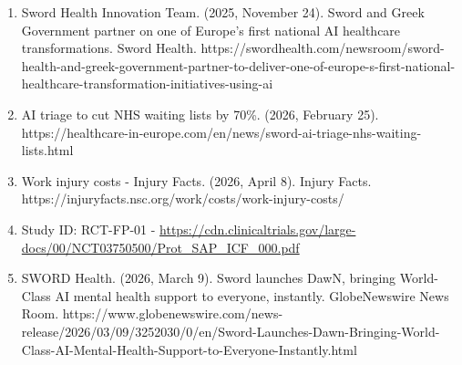 \documentclass[12pt]{article}
\begin{document}
\begin{enumerate}
    \item Sword Health Innovation Team. (2025, November 24). Sword and Greek Government partner on one of Europe’s first national AI healthcare transformations. Sword Health. https://swordhealth.com/newsroom/sword-health-and-greek-government-partner-to-deliver-one-of-europe-s-first-national-healthcare-transformation-initiatives-using-ai
    \item AI triage to cut NHS waiting lists by 70\%. (2026, February 25). https://healthcare-in-europe.com/en/news/sword-ai-triage-nhs-waiting-lists.html
    \item Work injury costs - Injury Facts. (2026, April 8). Injury Facts. https://injuryfacts.nsc.org/work/costs/work-injury-costs/
    \item Study ID: RCT-FP-01 - \url{https://cdn.clinicaltrials.gov/large-docs/00/NCT03750500/Prot_SAP_ICF_000.pdf}
    \item SWORD Health. (2026, March 9). Sword launches DawN, bringing World-Class AI mental health support to everyone, instantly. GlobeNewswire News Room. https://www.globenewswire.com/news-release/2026/03/09/3252030/0/en/Sword-Launches-Dawn-Bringing-World-Class-AI-Mental-Health-Support-to-Everyone-Instantly.html
\end{enumerate}
\end{document}

